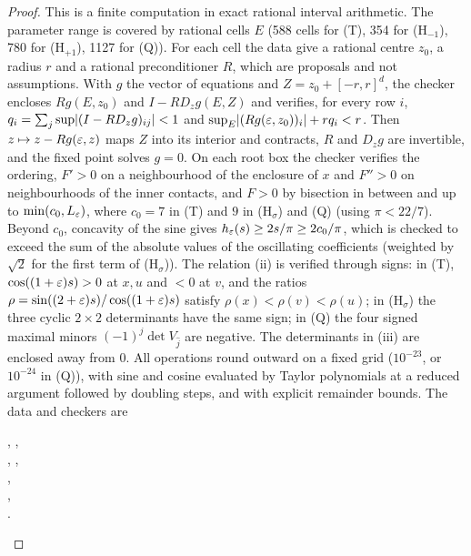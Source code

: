\begin{proof}
This is a finite computation in exact rational interval arithmetic. The parameter range is covered by rational
cells $E$ (588 cells for (T), 354 for (H$_{-1}$), 780 for (H$_{+1}$), 1127 for (Q)). For each cell the data give a
rational centre $z_0$, a radius $r$ and a rational preconditioner $R$, which are proposals and not assumptions. With
$g$ the vector of equations and $Z=z_0+[-r,r]^d$, the checker encloses $Rg(E,z_0)$ and $I-RD_zg(E,Z)$ and verifies, for
every row $i$, $q_i=\sum_j\sup\lvert(I-RD_zg)_{ij}\rvert<1$ and $\sup_E\lvert(Rg(\varepsilon,z_0))_i\rvert+rq_i<r$. Then $z\mapsto z-Rg(\varepsilon,z)$ maps $Z$
into its interior and contracts, $R$ and $D_zg$ are invertible, and the fixed point solves $g=0$. On each root box
the checker verifies the ordering, $F'>0$ on a neighbourhood of the enclosure of $x$ and $F''>0$ on neighbourhoods of
the inner contacts, and $F>0$ by bisection in between and up to $\min(c_0,L_\varepsilon)$, where $c_0=7$ in (T) and $9$ in
(H$_\sigma$) and (Q) (using $\pi<22/7$). Beyond $c_0$, concavity of the sine gives $h_\varepsilon(s)\ge2s/\pi\ge2c_0/\pi$, which is
checked to exceed the sum of the absolute values of the oscillating coefficients (weighted by $\sqrt2$ for the first
term of (H$_\sigma$)). The relation (ii) is verified through signs: in (T), $\cos((1+\varepsilon)s)>0$ at $x,u$ and $<0$ at $v$, and
the ratios $\rho=\sin((2+\varepsilon)s)/\cos((1+\varepsilon)s)$ satisfy $\rho(x)<\rho(v)<\rho(u)$; in (H$_\sigma$) the three cyclic $2\times2$
determinants have the same sign; in (Q) the four signed maximal minors $(-1)^j\det V_{\widehat j}$ are negative. The
determinants in (iii) are enclosed away from $0$. All operations round outward on a fixed grid ($10^{-23}$, or
$10^{-24}$ in (Q)), with sine and cosine evaluated by Taylor polynomials at a reduced argument followed by doubling
steps, and with explicit remainder bounds. The data and checkers are
\begin{center}\small
{}, ,\\
, ,\\
,\\
,\\
.
\end{center}
\end{proof}

